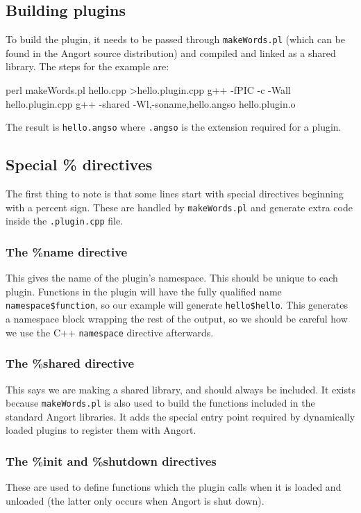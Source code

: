 \subsection{Building plugins}
To build the plugin, it needs to be passed through \texttt{makeWords.pl} 
(which can be found in the Angort source distribution) and compiled and linked as
a shared library. The steps for the example are:
\begin{v}
perl makeWords.pl hello.cpp >hello.plugin.cpp
g++ -fPIC -c -Wall hello.plugin.cpp
g++ -shared -Wl,-soname,hello.angso hello.plugin.o
\end{v}
The result is \texttt{hello.angso} where \texttt{.angso} is the extension
required for a plugin.


\subsection{Special \% directives}
The first thing to note is that some lines start with special
directives beginning with a percent sign. These are handled by
\texttt{makeWords.pl} and generate extra code inside the \texttt{.plugin.cpp} file.

\subsubsection{The \%name directive}
This gives the name of the plugin's namespace. This should be unique
to each plugin. Functions in the plugin will have the fully qualified
name \verb+namespace$function+, so our example will generate
\verb+hello$hello+. This generates a namespace block wrapping the rest
of the output, so we should be careful how we use the C++
\texttt{namespace} directive afterwards.

\subsubsection{The \%shared directive}
This says we are making a shared library, and should always be included.
It exists because \texttt{makeWords.pl} is also used to build the functions
included in the standard Angort libraries. It adds the special entry
point required by dynamically loaded plugins to register them with
Angort.

\subsubsection{The \%init and \%shutdown directives}
These are used to define functions which the plugin calls when
it is loaded and unloaded (the latter only occurs when Angort is shut
down). 

